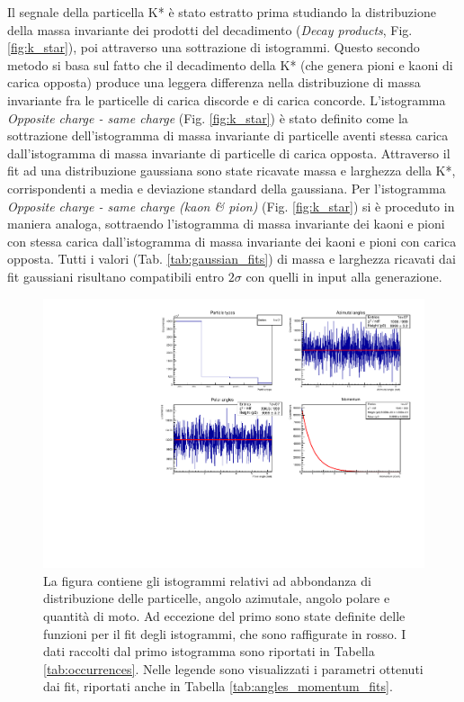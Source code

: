 \documentclass{article}
\begin{document}
Il segnale della particella K* è stato estratto prima studiando la distribuzione della massa invariante dei prodotti del decadimento (\textit{Decay products}, Fig. \ref{fig:k_star}), poi attraverso una sottrazione di istogrammi. Questo secondo metodo si basa sul fatto che il decadimento della K* (che genera pioni e kaoni di carica opposta) produce una leggera differenza nella distribuzione di massa invariante fra le particelle di carica discorde e di carica concorde. L'istogramma \textit{Opposite charge - same charge} (Fig. \ref{fig:k_star}) è stato definito come la sottrazione dell'istogramma di massa invariante di particelle aventi stessa carica dall'istogramma di massa invariante di particelle di carica opposta. Attraverso il fit ad una distribuzione gaussiana sono state ricavate massa e larghezza della K*, corrispondenti a media e deviazione standard della gaussiana. Per l'istogramma \textit{Opposite charge - same charge (kaon \& pion)} (Fig. \ref{fig:k_star}) si è proceduto in maniera analoga, sottraendo l'istogramma di massa invariante dei kaoni e pioni con stessa carica dall'istogramma di massa invariante dei kaoni e pioni con carica opposta. Tutti i valori (Tab. \ref{tab:gaussian_fits}) di massa e larghezza ricavati dai fit gaussiani risultano compatibili entro $2\sigma$ con quelli in input alla generazione.

\newpage

\begin{figure}[ht]\label{fig:angles_momentum}
    \centering
    \includegraphics[width=450pt]{images/first_canvas.pdf}
    \caption{La figura contiene gli istogrammi relativi ad abbondanza di distribuzione delle particelle, angolo azimutale, angolo polare e quantità di moto. Ad eccezione del primo sono state definite delle funzioni per il fit degli istogrammi, che sono raffigurate in rosso. I dati raccolti dal primo istogramma sono riportati in Tabella \ref{tab:occurrences}. Nelle legende sono visualizzati i parametri ottenuti dai fit, riportati anche in Tabella \ref{tab:angles_momentum_fits}.}
\end{figure}
\end{document}
